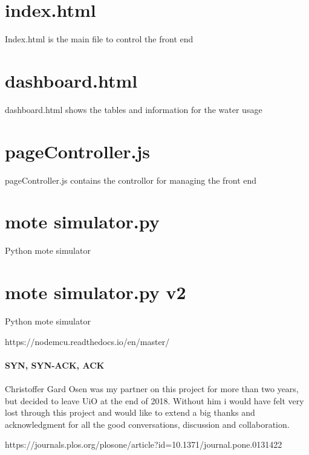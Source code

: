 \documentclass[]{uiophd}
\begin{document}
\section{index.html}
Index.html is the main file to control the front end


\section{dashboard.html}
dashboard.html shows the tables and information for the water usage


\section{pageController.js}
pageController.js contains the controllor for managing the front end


\section{mote simulator.py}
Python mote simulator


\section{mote simulator.py v2}
Python mote simulator


https://nodemcu.readthedocs.io/en/master/
\\\\
\textbf{SYN, SYN-ACK, ACK}
\\\\
Christoffer Gard Osen was my partner on this project for more than two years, but decided to leave UiO at the end of 2018. Without him i would have felt very lost through this project and would like to extend a big thanks and acknowledgment for all the good conversations, discussion and collaboration.



https://journals.plos.org/plosone/article?id=10.1371/journal.pone.0131422
\end{document}
